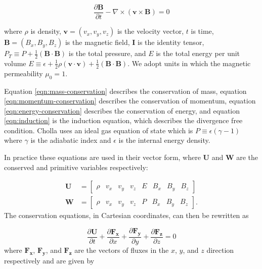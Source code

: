 \documentclass[modern, linenumbers]{aastex631}
\begin{document}
\begin{equation}
    \label{eqn:induction}
    \frac{\partial \boldsymbol{B}}{\partial t} - \nabla \times (\boldsymbol{v} \times \boldsymbol{B}) = 0
\end{equation}

\noindent where $\rho$ is density, $\boldsymbol{v} = ( v_x, v_y, v_z)$ is the velocity vector, $t$ is time, $\boldsymbol{B} = ( B_x, B_y, B_z)$ is the magnetic field, $\boldsymbol{I}$ is the identity tensor, $P_T \equiv P + \frac{1}{2}(\boldsymbol{B} \cdot \boldsymbol{B})$ is the total pressure, and $E$ is the total energy per unit volume $E \equiv \epsilon + \frac{1}{2}\rho(\boldsymbol{v}\cdot\boldsymbol{v}) + \frac{1}{2}(\boldsymbol{B}\cdot\boldsymbol{B})$. We adopt units in which the magnetic permeability $\mu_0 = 1$.

Equation \ref{eqn:mass-conservation} describes the conservation of mass, equation \ref{eqn:momentum-conservation} describes the conservation of momentum, equation \ref{eqn:energy-conservation} describes the conservation of energy, and equation \ref{eqn:induction} is the induction equation, which describes the divergence free condition. Cholla uses an ideal gas equation of state  which is $P \equiv \epsilon(\gamma - 1)$ where $\gamma$ is the adiabatic index and $\epsilon$ is the internal energy density.

In practice these equations are used in their vector form, where $\boldsymbol{U}$ and $\boldsymbol{W}$ are the conserved and primitive variables respectively:

\begin{align}
    \boldsymbol{U} &= \begin{bmatrix}
            \rho &
            v_x &
            v_y &
            v_z &
            E   &
            B_x &
            B_y &
            B_z
         \end{bmatrix}
    \\
    \boldsymbol{W} &= \begin{bmatrix}
            \rho &
            v_x &
            v_y &
            v_z &
            P   &
            B_x &
            B_y &
            B_z
         \end{bmatrix}.
\end{align}
The conservation equations, in Cartesian coordinates, can then be rewritten as

\begin{equation}
    \label{eqn:vector-conserved}
    \frac{\partial \boldsymbol{U}}{\partial t} +
    \frac{\partial \boldsymbol{F_x}}{\partial x} +
    \frac{\partial \boldsymbol{F_y}}{\partial y} +
    \frac{\partial \boldsymbol{F_z}}{\partial z} = 0
\end{equation}
where $\boldsymbol{F_x}$, $\boldsymbol{F_y}$, and $\boldsymbol{F_z}$ are the vectors of fluxes in the $x$, $y$, and $z$ direction respectively and are given by
\end{document}
